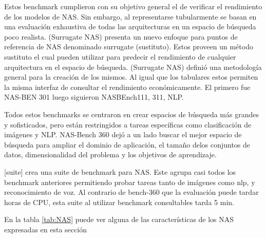 Estos benchmark cumplieron con su objetivo general el de verificar el rendimiento de los modelos de NAS. Sin embargo, al representarse tubularmente se basan en una 
evaluación exhaustiva de todas las arquitecturas en un espacio de búsqueda poco realista. (Surrugate NAS) presenta un nuevo enfoque para puntos de referencia de NAS 
denominado surrugate (sustituto). Estos proveen un método sustituto el cual pueden utilizar para predecir el rendimiento de cualquier arquitectura en el espacio de 
búsqueda. (Surrugate NAS) definió una metodología general para la creación de los mismos. Al igual que los tabulares estos permiten la misma interfaz de consultar el 
rendimiento económicamente. El primero fue NAS-BEN 301 luego siguieron NASBEnch111, 311, NLP.

Todos estos benchmarks se centraron en crear espacios de búsqueda más grandes y sofisticados, pero están restringidos a tareas específicas como clasificación de imágenes 
y NLP. NAS-Bench 360 dejó a un lado buscar el mejor espacio de búsqueda para ampliar el dominio de aplicación, el tamaño delos conjuntos de datos, dimensionalidad del 
problema y los objetivos de aprendizaje.

[suite] crea una suite de benchmark para NAS. Este agrupa casi todos los benchmark anteriores permitiendo probar tareas tanto de imágenes como nlp, y reconocimiento de 
voz. Al contrario de bench-360 que la evaluación puede tardar horas de CPU, esta suite al utilizar benchmark consultables tarda 5 min.

En la tabla \ref{tab:NAS} puede ver alguna de las características de los NAS expresadas en esta sección





      
       
